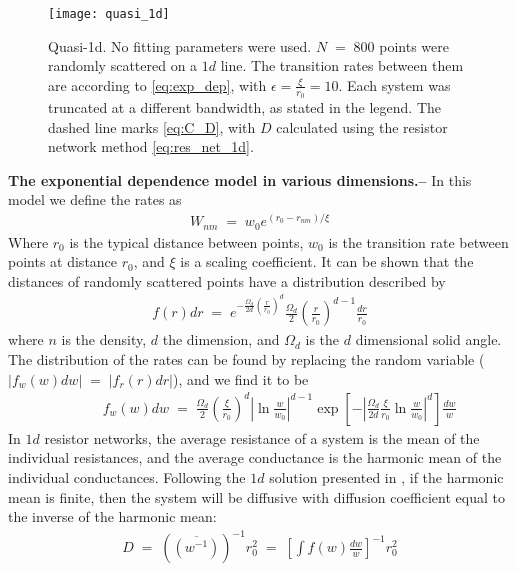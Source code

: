 \documentclass[onecolumn,fleqn,notitlepage,secnumarabic]{revtex4}
\begin{document}

\begin{figure}
    \texttt{[image: quasi\_1d]}
    \caption{Quasi-1d. No fitting parameters were used. $N\;=\;800$ points were randomly scattered on a $1d$ line. The transition rates between them are according to \autoref{eq:exp_dep}, with $\epsilon=\frac{\xi}{r_0}=10$. Each system was truncated at a different bandwidth, as stated in the legend. The dashed line marks \autoref{eq:C_D}, with $D$ calculated using the resistor network method \autoref{eq:res_net_1d}. }
    \label{fig:quasi_1d}
\end{figure}

{ \bf The exponential dependence model in various dimensions.--} In this model we define the rates as 
\begin{align} \label{eq:exp_dep}
  W_{nm}\;=\; w_0 e^{(r_0-r_{nm})/ \xi}
\end{align}
Where $r_0$ is the typical distance between points, $w_0$ is the transition rate between points at distance $r_0$, and $\xi$ is a scaling coefficient. It can be shown that the distances of randomly scattered points have a distribution described by 
\begin{align}
  f(r)dr \;=\; e^{-\frac{\Omega_d}{2d} \left(\frac{r}{r_0}\right)^d} \frac{\Omega_d}{2} \left(\frac{r}{r_0}\right)^{d-1}\frac{dr}{r_0}
\end{align}
where $n$ is the density, $d$ the dimension, and $\Omega_d$ is the $d$ dimensional solid angle. The distribution of the rates can be found by replacing the random variable ($|f_w(w)dw| \;=\; |f_r(r)dr|$), and we find it to be 
\begin{align}\label{eq:f_w}
 &\qquad f_w(w)dw \;=\; \frac{\Omega_d}{2}\left(\frac{\xi}{r_0}\right)^d\left|\ln \frac{w}{w_0}\right|^{d-1} \exp\left[-\left|\frac{\Omega_d}{2d}\frac{\xi}{r_0}\ln \frac{w}{w_0}\right|^d\right] \frac{dw}{w}
\end{align}
In $1d$ resistor networks, the average resistance of a system is the mean of the individual resistances, and the average conductance is the harmonic mean of the individual conductances. Following the $1d$ solution presented in \cite{Alexander:1981:RMP}, if the harmonic mean is finite, then the system will be diffusive with diffusion coefficient equal to the inverse of the harmonic mean:
\begin{align}
    D \;=\; \left(\overline{(w^{-1})}\right)^{-1}r_0^2 \;=\; \left[\int f(w) \frac{dw}{w}\right]^{-1} r_0^2
\end{align}
\end{document}
